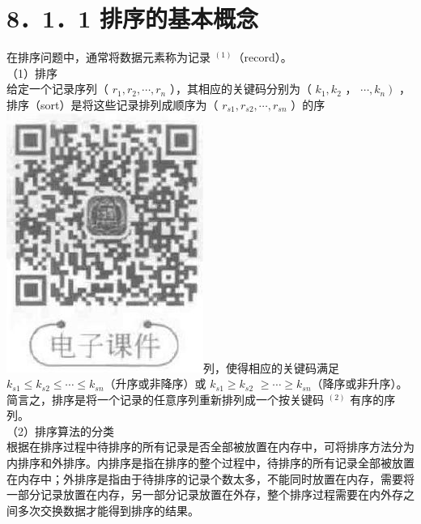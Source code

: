 \documentclass[10pt]{article}
\begin{document}
\section*{8．1．1 排序的基本概念}
在排序问题中，通常将数据元素称为记录 ${ }^{(1)}$（record）。\\
（1）排序\\
给定一个记录序列（ $r_{1}, r_{2}, \cdots, r_{n}$ ），其相应的关键码分别为（ $k_{1}, k_{2}$ ， $\left.\cdots, k_{n}\right)$ ，排序（sort）是将这些记录排列成顺序为（ $r_{s 1}, r_{s 2}, \cdots, r_{s n}$ ）的序\\
\includegraphics[max width=\textwidth]{2025_06_06_704745ea57b15b2333e5g-269}列，使得相应的关键码满足 $k_{s 1} \leqslant k_{s 2} \leqslant \cdots \leqslant k_{s n}$（升序或非降序）或 $k_{s 1} \geqslant k_{s 2}$ $\geqslant \cdots \geqslant k_{s n}$（降序或非升序）。简言之，排序是将一个记录的任意序列重新排列成一个按关键码 ${ }^{(2)}$ 有序的序列。\\
（2）排序算法的分类\\
根据在排序过程中待排序的所有记录是否全部被放置在内存中，可将排序方法分为内排序和外排序。内排序是指在排序的整个过程中，待排序的所有记录全部被放置在内存中；外排序是指由于待排序的记录个数太多，不能同时放置在内存，需要将一部分记录放置在内存，另一部分记录放置在外存，整个排序过程需要在内外存之间多次交换数据才能得到排序的结果。
\end{document}
